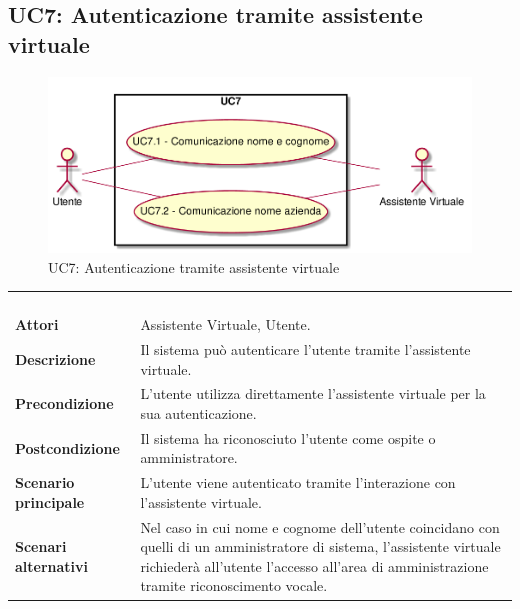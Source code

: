 \subsection{UC7: Autenticazione tramite assistente virtuale}
\label{UC7}
\begin{figure}[h]
\centering
\includegraphics[width=\textwidth,height=\textheight,keepaspectratio]{images/UseCaseUC7.png}
\caption{UC7: Autenticazione tramite assistente virtuale}
\end{figure}
\begin{longtable}{l|p{10cm}}
\rowcolor[gray]{0.8} \multicolumn{2}{c}{} \\
\rowcolor[gray]{0.8} \multicolumn{2}{c}{\textbf{UC7 - Autenticazione tramite assistente virtuale}} \\
\rowcolor[gray]{0.8} \multicolumn{2}{c}{} \\
\hline
&\\
\textbf{Attori} & Assistente Virtuale, Utente.\\[7pt]
\textbf{Descrizione} & Il sistema può autenticare l'utente tramite l'assistente virtuale.\\[7pt]
\textbf{Precondizione} & L'utente utilizza direttamente l'assistente virtuale per la sua autenticazione.\\[7pt]
\textbf{Postcondizione} & Il sistema ha riconosciuto l'utente come ospite o amministratore.\\[7pt]
\textbf{Scenario principale} &L'utente viene autenticato tramite l'interazione con l'assistente virtuale.\\[7pt]
\textbf{Scenari alternativi} & Nel caso in cui nome e cognome dell'utente coincidano con quelli di un amministratore di sistema, l'assistente virtuale 
richiederà all'utente l'accesso all'area di amministrazione tramite riconoscimento vocale.\\[7pt]\hline
\end{longtable}

